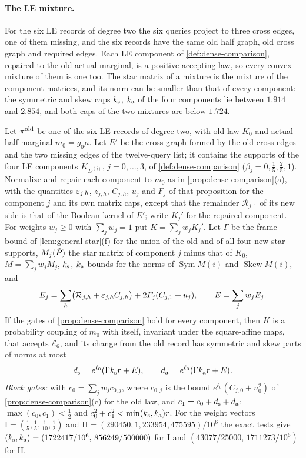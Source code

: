 \paragraph{The LE mixture.}
For the six LE records of degree two the six queries project to three cross edges,
one of them missing, and the six records have the same old half graph, old cross
graph and required edges. Each LE component of \cref{def:dense-comparison},
repaired to the old actual marginal, is a positive accepting law, so every convex
mixture of them is one too. The star matrix of a mixture is the mixture of the
component matrices, and its norm can be smaller than that of every component: the
symmetric and skew caps $k_{\rm s}$, $k_{\rm a}$ of the four components lie
between $1.914$ and $2.854$, and both caps of the two mixtures are below $1.724$.

\begin{proposition}\label{prop:le-mixture}
Let $\pi^{\rm old}$ be one of the six LE records of degree two, with old law $K_0$
and actual half marginal $m_0=g_0\mu$. Let $E'$ be the cross graph formed by the old
cross edges and the two missing edges of the twelve-query list; it contains the
supports of the four LE components $K_{D^{(j)}}$, $j=0,\dots,3$, of
\cref{def:dense-comparison} ($\beta_j=0,\frac15,\frac25,1$). Normalize and repair each
component to $m_0$ as in \cref{prop:dense-comparison}(a), with the quantities
$\varepsilon_{j,h}$, $z_{j,h}$, $C_{j,h}$, $u_j$ and $F_j$ of that proposition for the
component $j$ and its own matrix caps, except that the remainder $\mathcal R_{j,1}$
of its new side is that of the Boolean kernel of $E'$; write $K_j'$ for the repaired
component. For weights $w_j\ge0$ with $\sum_jw_j=1$ put $K=\sum_jw_jK_j'$. Let
$\Gamma$ be the frame bound of \cref{lem:general-star}(f) for the union of the old
and of all four new star supports, $M_j(\hat P)$ the star matrix of component $j$
minus that of $K_0$, $M=\sum_jw_jM_j$, $k_{\rm s}$, $k_{\rm a}$ bounds for the norms of
$\operatorname{Sym}M(i)$ and $\operatorname{Skew}M(i)$, and
\[
 E_j=\sum_h\bigl(\mathcal R_{j,h}+\varepsilon_{j,h}C_{j,h}\bigr)+2F_j(C_{j,1}+u_j),\qquad
 E=\sum_jw_jE_j .
\]
If the gates of \cref{prop:dense-comparison} hold for every component, then $K$ is
a probability coupling of $m_0$ with itself, invariant under the square-affine maps,
that accepts $\mathcal E_6$, and its change from the old record has symmetric and
skew parts of norms at most
\[
 d_{\rm s}=e^{\ell_0}(\Gamma k_{\rm s}r+E),\qquad d_{\rm a}=e^{\ell_0}(\Gamma k_{\rm a}r+E).
\]
\emph{Block gates:} with $c_0=\sum_jw_jc_{0,j}$, where $c_{0,j}$ is the bound
$e^{\ell_0}(C_{j,0}+u_0^2)$ of \cref{prop:dense-comparison}(c) for the old law, and
$c_1=c_0+d_{\rm s}+d_{\rm a}$: $\max(c_0,c_1)<\frac12$ and
$c_0^2+c_1^2<\min(k_{\rm s},k_{\rm a})r$. For the weight vectors
$\mathrm I=(\frac15,\frac15,\frac1{10},\frac12)$ and
$\mathrm{II}=(290450,1,233954,475595)/10^6$ the exact tests give
$(k_{\rm s},k_{\rm a})=(1722417/10^6,\,856249/500000)$ for I and
$(43077/25000,\,1711273/10^6)$ for II.
\end{proposition}

